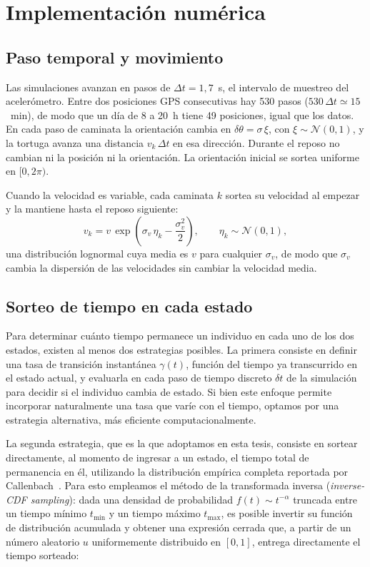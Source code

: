 \chapter{Implementación numérica}\label{A:implementacio_num}

\section*{Paso temporal y movimiento}

Las simulaciones avanzan en pasos de $\Delta t = 1{,}7$~s, el intervalo de muestreo del acelerómetro. Entre dos posiciones GPS consecutivas hay 530 
pasos ($530\,\Delta t \simeq 15$~min), de modo que un día de 8 a 20~h tiene 49 posiciones, igual que los datos. En cada paso de caminata la orientación 
cambia en $\delta\theta = \sigma\,\xi$, con $\xi \sim \mathcal{N}(0,1)$, y la tortuga avanza una distancia $v_k\,\Delta t$ en esa dirección. Durante el 
reposo no cambian ni la posición ni la orientación. La orientación inicial se sortea uniforme en $[0, 2\pi)$.

Cuando la velocidad es variable, cada caminata $k$ sortea su velocidad al empezar y la mantiene hasta el reposo siguiente:
\begin{equation}
    v_k = v\,\exp\!\left(\sigma_v\,\eta_k - \frac{\sigma_v^2}{2}\right), \qquad \eta_k \sim \mathcal{N}(0,1),
\end{equation}
una distribución lognormal cuya media es $v$ para cualquier $\sigma_v$, de modo que $\sigma_v$ cambia la dispersión de las velocidades sin cambiar la velocidad media.

\section*{Sorteo de tiempo en cada estado}

Para determinar cuánto tiempo permanece un individuo en cada uno de los dos estados, existen al menos dos estrategias posibles. La primera consiste en 
definir una tasa de transición instantánea $\gamma(t)$, función del tiempo ya transcurrido en el estado actual, y evaluarla en cada paso de tiempo discreto 
$\delta t$ de la simulación para decidir si el individuo cambia de estado. Si bien este enfoque permite incorporar naturalmente una tasa que varíe con el 
tiempo, optamos por una estrategia alternativa, más eficiente computacionalmente.

La segunda estrategia, que es la que adoptamos en esta tesis, consiste en sortear directamente, al momento de ingresar a un estado, el tiempo total de 
permanencia en él, utilizando la distribución empírica completa reportada por Callenbach~\cite{callenbach2025}. Para esto empleamos el método de la 
transformada inversa (\textit{inverse-CDF sampling}): dada una densidad de probabilidad $f(t)\sim t^{-\alpha}$ truncada entre un tiempo mínimo $t_{\min}$ 
y un tiempo máximo $t_{\max}$, es posible invertir su función de distribución acumulada y obtener una expresión cerrada que, a partir de un número aleatorio 
$u$ uniformemente distribuido en $[0,1]$, entrega directamente el tiempo sorteado:

